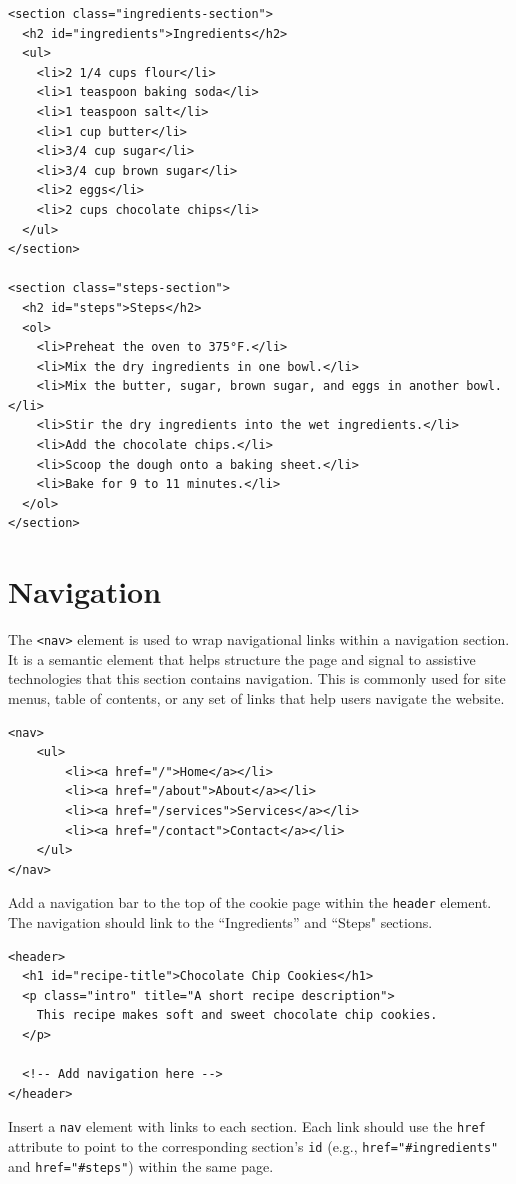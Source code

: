 \begin{Answer}[ref=html-lists1]
\begin{verbatim}
<section class="ingredients-section">
  <h2 id="ingredients">Ingredients</h2>
  <ul>
    <li>2 1/4 cups flour</li>
    <li>1 teaspoon baking soda</li>
    <li>1 teaspoon salt</li>
    <li>1 cup butter</li>
    <li>3/4 cup sugar</li>
    <li>3/4 cup brown sugar</li>
    <li>2 eggs</li>
    <li>2 cups chocolate chips</li>
  </ul>
</section>

<section class="steps-section">
  <h2 id="steps">Steps</h2>
  <ol>
    <li>Preheat the oven to 375°F.</li>
    <li>Mix the dry ingredients in one bowl.</li>
    <li>Mix the butter, sugar, brown sugar, and eggs in another bowl.</li>
    <li>Stir the dry ingredients into the wet ingredients.</li>
    <li>Add the chocolate chips.</li>
    <li>Scoop the dough onto a baking sheet.</li>
    <li>Bake for 9 to 11 minutes.</li>
  </ol>
</section>
\end{verbatim}
\end{Answer}

\section{Navigation}
The \verb|<nav>| element is used to wrap navigational links within a navigation section. It is a semantic element
that helps structure the page and signal to assistive technologies that this section contains navigation.
This is commonly used for site menus, table of contents, or any set of links that help users navigate the website.

\begin{verbatim}
<nav>
    <ul>
        <li><a href="/">Home</a></li>
        <li><a href="/about">About</a></li>
        <li><a href="/services">Services</a></li>
        <li><a href="/contact">Contact</a></li>
    </ul>
</nav>
\end{verbatim}

\begin{Exercise}[label=html-nav1, title=Creating a Simple Navigation Bar]
Add a navigation bar to the top of the cookie page within the \texttt{header} element.
The navigation should link to the “Ingredients” and “Steps" sections.

\begin{verbatim}
<header>
  <h1 id="recipe-title">Chocolate Chip Cookies</h1>
  <p class="intro" title="A short recipe description">
    This recipe makes soft and sweet chocolate chip cookies.
  </p>

  <!-- Add navigation here -->
</header>
\end{verbatim}

Insert a \texttt{nav} element with links to each section. 
Each link should use the \texttt{href} attribute to point to the corresponding section's \texttt{id} (e.g., \texttt{href="\#ingredients"} and \texttt{href="\#steps"}) within the same page.
\end{Exercise}

